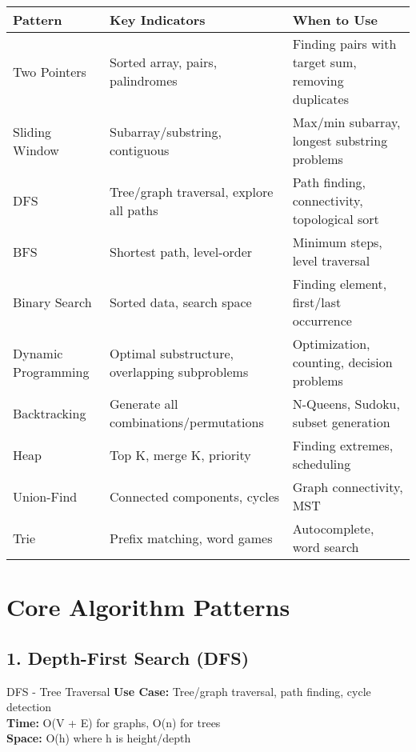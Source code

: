 \documentclass[10pt,a4paper]{article}
\begin{document}
\begin{table}[h]
\centering
\begin{tabular}{|p{3cm}|p{4cm}|p{7cm}|}
\hline
\textbf{Pattern} & \textbf{Key Indicators} & \textbf{When to Use} \\
\hline
Two Pointers & Sorted array, pairs, palindromes & Finding pairs with target sum, removing duplicates \\
\hline
Sliding Window & Subarray/substring, contiguous & Max/min subarray, longest substring problems \\
\hline
DFS & Tree/graph traversal, explore all paths & Path finding, connectivity, topological sort \\
\hline
BFS & Shortest path, level-order & Minimum steps, level traversal \\
\hline
Binary Search & Sorted data, search space & Finding element, first/last occurrence \\
\hline
Dynamic Programming & Optimal substructure, overlapping subproblems & Optimization, counting, decision problems \\
\hline
Backtracking & Generate all combinations/permutations & N-Queens, Sudoku, subset generation \\
\hline
Heap & Top K, merge K, priority & Finding extremes, scheduling \\
\hline
Union-Find & Connected components, cycles & Graph connectivity, MST \\
\hline
Trie & Prefix matching, word games & Autocomplete, word search \\
\hline
\end{tabular}
\end{table}

\section{Core Algorithm Patterns}

\subsection{1. Depth-First Search (DFS)}

\begin{patternbox}{DFS - Tree Traversal}
\textbf{Use Case:} Tree/graph traversal, path finding, cycle detection\\
\textbf{Time:} O(V + E) for graphs, O(n) for trees\\
\textbf{Space:} O(h) where h is height/depth
\end{patternbox}
\end{document}
